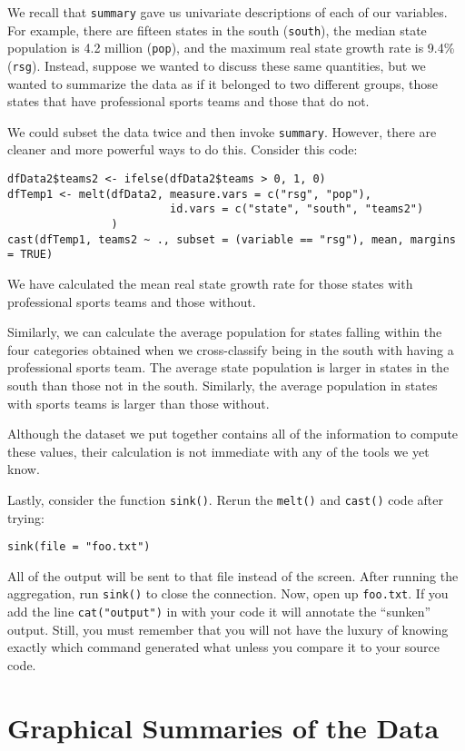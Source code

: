 We recall that \texttt{summary} gave us univariate descriptions of
each of our variables. For example, there are fifteen states in the
south (\texttt{south}), the median state population is 4.2 million
(\texttt{pop}), and the maximum real state growth rate is 9.4\%
(\texttt{rsg}). Instead, suppose we wanted to discuss these same
quantities, but we wanted to summarize the data as if it belonged to
two different groups, those states that have professional sports teams
and those that do not.

We could subset the data twice and then invoke
\texttt{summary}. However, there are cleaner and more powerful ways to
do this. Consider this code:
\begin{verbatim}
dfData2$teams2 <- ifelse(dfData2$teams > 0, 1, 0)
dfTemp1 <- melt(dfData2, measure.vars = c("rsg", "pop"), 
                         id.vars = c("state", "south", "teams2")
                )
cast(dfTemp1, teams2 ~ ., subset = (variable == "rsg"), mean, margins = TRUE)
\end{verbatim}
We have calculated the mean real state growth rate for those states
with professional sports teams and those without.

Similarly, we can calculate the average population for states falling
within the four categories obtained when we cross-classify being in
the south with having a professional sports team. The average state
population is larger in states in the south than those not in the
south. Similarly, the average population in states with sports teams
is larger than those without.

Although the dataset we put together contains all of the information
to compute these values, their calculation is not immediate with any
of the tools we yet know.

Lastly, consider the function \texttt{sink()}. Rerun the
\texttt{melt()} and \texttt{cast()} code after trying:
\begin{verbatim}
sink(file = "foo.txt")
\end{verbatim}
All of the \R{} output will be sent to that file instead of the
screen. After running the aggregation, run \texttt{sink()} to close
the connection. Now, open up \texttt{foo.txt}. If you add the line
\texttt{cat("output")} in with your code it will annotate the
``sunken'' output. Still, you must remember that you will not have the
luxury of knowing exactly which command generated what unless you
compare it to your source code.

\section{Graphical Summaries of the Data}

